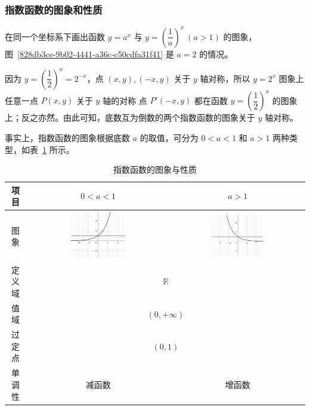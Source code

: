 \documentclass[a4paper,openany]{ctexbook}
\begin{document}
\subsubsection{指数函数的图象和性质}

在同一个坐标系下画出函数 \(y=a^x\) 与 \(y=\left( \dfrac{1}{a} \right)^x\ (a>1)\) 的图象，图~\ref{828db3ce-9b02-4441-a36c-c50cdfa31f41} 是 \(a=2\) 的情况。

因为 \(y={\left( \dfrac{1}{2} \right)}^x=2^{-x}\)，点 \((x,y),(-x,y)\) 关于 \(y\) 轴对称，所以 \(y=2^x\) 图象上任意一点 \(P(x,y)\) 关于 \(y\) 轴的对称
点 \(P'(-x,y)\) 都在函数 \(y={\left( \dfrac{1}{2} \right)}^x\) 的图象上；反之亦然。由此可知，底数互为倒数的两个指数函数的图象关于 \(y\) 轴对称。

事实上，指数函数的图象根据底数 \(a\) 的取值，可分为 \(0<a<1\) 和 \(a>1\) 两种类型，如表~\ref{tbl:viuuhjuutuxlxkvi} 所示。

\begin{table}
    \begin{tabular}{|c|c|c|} \hline
        项目   & \(0<a<1\)                                          & \(a>1\)                                            \\ \hline
        图象   & \includegraphics[width=0.4\textwidth]{image27.png} & \includegraphics[width=0.4\textwidth]{image28.png} \\ \hline
        定义域 & \multicolumn{2}{c|}{\(\mathbb{R} \)}                                                                    \\ \hline
        值域   & \multicolumn{2}{c|}{\((0,+\infty )\)}                                                                   \\ \hline
        过定点 & \multicolumn{2}{c|}{\((0,1)\)}                                                                          \\ \hline
        单调性 & 减函数                                             & 增函数                                             \\ \hline
    \end{tabular}
    \caption{指数函数的图象与性质} \label{tbl:viuuhjuutuxlxkvi}
\end{table}
\end{document}
